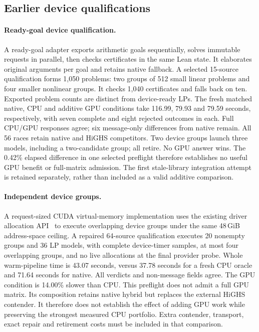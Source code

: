 \documentclass[10pt,twocolumn]{article}
\begin{document}
\subsection{Earlier device qualifications}\label{app:device-qualification-history}
\paragraph{Ready-goal device qualification.}
A ready-goal adapter exports arithmetic goals sequentially, solves immutable
requests in parallel, then checks certificates in the same Lean state. It
elaborates original arguments per goal and retains native fallback. A selected
15-source qualification forms 1,050 problems: two groups of 512 small linear
problems and four smaller nonlinear groups. It checks 1,040 certificates
and falls back on ten. Exported problem counts are distinct from device-ready
LPs. The fresh matched native, CPU and additive GPU conditions take 116.99,
79.93 and 79.59 seconds, respectively, with seven complete and eight rejected
outcomes in each. Full CPU/GPU responses agree; six message-only differences
from native remain. All 56 races retain native and HiGHS competitors.
Two device groups launch three models, including a two-candidate group;
all retire. No GPU answer wins. The 0.42\% elapsed difference in one selected
preflight therefore establishes no useful GPU benefit or full-matrix
admission. The first stale-library integration attempt is retained separately,
rather than included as a valid additive comparison.

\paragraph{Independent device groups.}
A request-sized CUDA virtual-memory implementation uses the existing driver allocation API~\cite{cudaVMM} to execute overlapping device
groups under the same 48\,GiB address-space ceiling. A repaired 64-source
qualification executes 20 nonempty groups and 36 LP models, with complete
device-timer samples, at most four overlapping groups, and no live allocations
at the final provider probe. Whole warm-pipeline time is 43.07 seconds,
versus 37.78 seconds for a fresh CPU oracle and 71.64 seconds for native.
All verdicts and non-message fields agree. The GPU condition is 14.00\%
slower than CPU. This preflight does not admit a full GPU matrix.
Its composition retains native hybrid but replaces the external HiGHS
contender. It therefore does not establish the effect of adding GPU work
while preserving the strongest measured CPU portfolio. Extra contender,
transport, exact repair and retirement costs must be included in that comparison.
\end{document}

